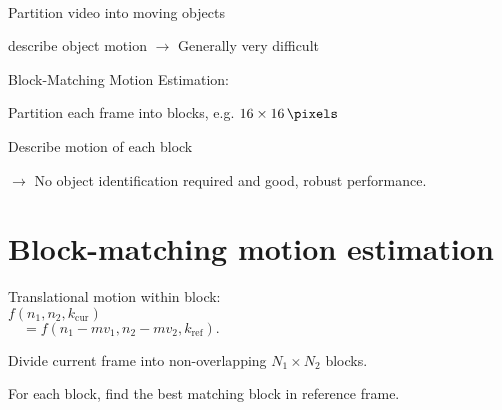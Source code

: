 \begin{compactdesc}
	\item[\lp{Ideal situation}]\hfill\\
		\begin{enumerate*}[label=\protect\circled{\arabic*},itemjoin=]
			\item Partition video into moving objects \\
			\item describe object motion $\to$ Generally very difficult\\
		\end{enumerate*}
	\item[\lp{Practical approach}] Block-Matching Motion Estimation:\hfill\\
		\begin{enumerate*}[label=\protect\circled{\arabic*},itemjoin=]
			\item Partition each frame into blocks, e.g. $16\times\SI{16}{\pixels}$\\
			\item Describe motion of each block\\
		\end{enumerate*}
		$\to$  No object identification required and good, robust performance.
\section{Block-matching motion estimation}
\item[\lp{Assumptions:}]
\begin{enumerate*}[label=\protect\circled{\arabic*},itemjoin=]
	\item Translational motion within block:\\
		$f(n_1,n_2,k_{\text{cur}})$\\$\quad=f(n_1-mv_1,n_2-mv_2,k_{\text{ref}}).$
\end{enumerate*}
\item[\lp{ME Algorithm}] 
	\begin{enumerate*}[label=\protect\circled{\arabic*},itemjoin=]
		\item Divide current frame into non-overlapping $N_1\times N_2$ blocks.\\
		\item For each block, find the best matching block in reference frame.
	\end{enumerate*}

\end{compactdesc}
